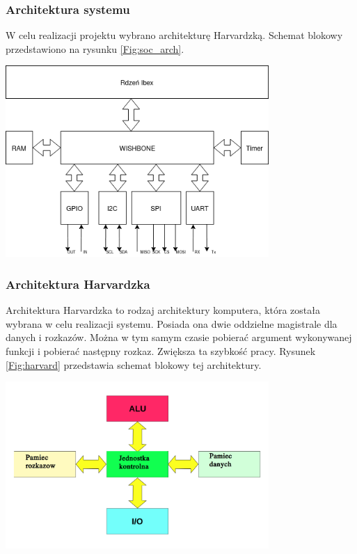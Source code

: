 \documentclass[11pt,a4paper]{article}
\begin{document}
		\subsubsection{Architektura systemu}
		W celu realizacji projektu wybrano architekturę Harvardzką. Schemat blokowy przedstawiono na rysunku \ref{Fig:soc_arch}.
		\begin{center}
		\includegraphics[width=10cm]{./rysunki/soc.png}
		\end{center}
		\subsubsection{Architektura Harvardzka}
		\hspace{5mm}
			Architektura Harvardzka to rodzaj architektury komputera, która została wybrana w celu realizacji systemu. Posiada ona dwie oddzielne magistrale dla danych i rozkazów. Można w tym samym czasie pobierać argument wykonywanej funkcji i pobierać następny rozkaz. Zwiększa ta szybkość pracy. Rysunek \ref{Fig:harvard} przedstawia schemat blokowy tej architektury.\\
\begin{samepage}
			
\nopagebreak
\begin{center}
		\includegraphics[width=10cm]{./rysunki/Harvard_architecture.png}
		\end{center}
\end{samepage}
\end{document}
